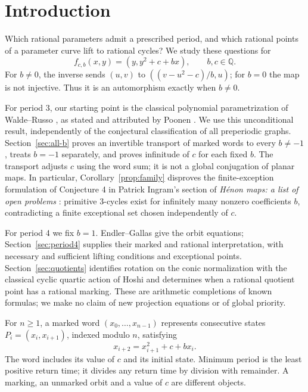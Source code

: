 \documentclass{jT}
\newcommand{\Q}{\mathbb Q}
\begin{document}
\section{Introduction}\label{sec:intro}
Which rational parameters admit a prescribed period, and which rational points of a parameter curve lift to rational cycles? We study these questions for
\begin{equation}\label{eq:map}
f_{c,b}(x,y)=(y,y^2+c+bx),\qquad b,c\in\Q.
\end{equation}
For $b\ne0$, the inverse sends $(u,v)$ to $((v-u^2-c)/b,u)$; for $b=0$ the map is not injective. Thus it is an automorphism exactly when $b\ne0$.

For period 3, our starting point is the classical polynomial parametrization of Walde--Russo \cite{walde-russo}, as stated and attributed by Poonen \cite[Theorem 1(3), p.~5]{poonen}. We use this unconditional result, independently of the conjectural classification of all preperiodic graphs. Section~\ref{sec:all-b} proves an invertible transport of marked words to every $b\ne-1$, treats $b=-1$ separately, and proves infinitude of $c$ for each fixed $b$. The transport adjusts $c$ using the word sum; it is not a global conjugation of planar maps. In particular, Corollary~\ref{prop:family} disproves the finite-exception formulation of Conjecture 4 in Patrick Ingram's section of \emph{H\'enon maps: a list of open problems} \cite[\S11]{problems}: primitive 3-cycles exist for infinitely many nonzero coefficients $b$, contradicting a finite exceptional set chosen independently of $c$.

For period 4 we fix $b=1$. Endler--Gallas \cite{endler-gallas} give the orbit equations; Section~\ref{sec:period4} supplies their marked and rational interpretation, with necessary and sufficient lifting conditions and exceptional points. Section~\ref{sec:quotients} identifies rotation on the conic normalization with the classical cyclic quartic action of Hoshi \cite[\S3, p.~7]{hoshi} and determines when a rational quotient point has a rational marking. These are arithmetic completions of known formulas; we make no claim of new projection equations or of global priority.

For $n\ge1$, a marked word $(x_0,\ldots,x_{n-1})$ represents consecutive states $P_i=(x_i,x_{i+1})$, indexed modulo $n$, satisfying
\begin{equation}\label{eq:cycle}
x_{i+2}=x_{i+1}^2+c+bx_i.
\end{equation}
The word includes its value of $c$ and its initial state. Minimum period is the least positive return time; it divides any return time by division with remainder. A marking, an unmarked orbit and a value of $c$ are different objects.
\end{document}
